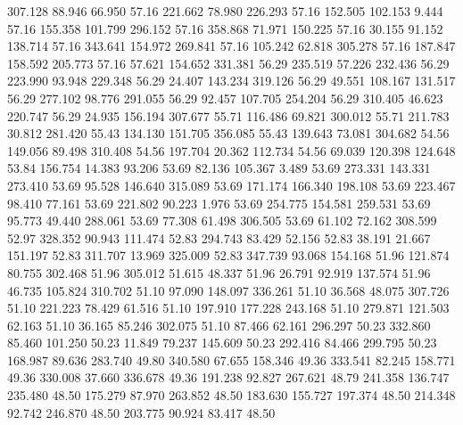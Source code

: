  307.128   88.946   66.950        57.16
 221.662   78.980  226.293        57.16
 152.505  102.153    9.444        57.16
 155.358  101.799  296.152        57.16
 358.868   71.971  150.225        57.16
  30.155   91.152  138.714        57.16
 343.641  154.972  269.841        57.16
 105.242   62.818  305.278        57.16
 187.847  158.592  205.773        57.16
  57.621  154.652  331.381        56.29
 235.519   57.226  232.436        56.29
 223.990   93.948  229.348        56.29
  24.407  143.234  319.126        56.29
  49.551  108.167  131.517        56.29
 277.102   98.776  291.055        56.29
  92.457  107.705  254.204        56.29
 310.405   46.623  220.747        56.29
  24.935  156.194  307.677        55.71
 116.486   69.821  300.012        55.71
 211.783   30.812  281.420        55.43
 134.130  151.705  356.085        55.43
 139.643   73.081  304.682        54.56
 149.056   89.498  310.408        54.56
 197.704   20.362  112.734        54.56
  69.039  120.398  124.648        53.84
 156.754   14.383   93.206        53.69
  82.136  105.367    3.489        53.69
 273.331  143.331  273.410        53.69
  95.528  146.640  315.089        53.69
 171.174  166.340  198.108        53.69
 223.467   98.410   77.161        53.69
 221.802   90.223    1.976        53.69
 254.775  154.581  259.531        53.69
  95.773   49.440  288.061        53.69
  77.308   61.498  306.505        53.69
  61.102   72.162  308.599        52.97
 328.352   90.943  111.474        52.83
 294.743   83.429   52.156        52.83
  38.191   21.667  151.197        52.83
 311.707   13.969  325.009        52.83
 347.739   93.068  154.168        51.96
 121.874   80.755  302.468        51.96
 305.012   51.615   48.337        51.96
  26.791   92.919  137.574        51.96
  46.735  105.824  310.702        51.10
  97.090  148.097  336.261        51.10
  36.568   48.075  307.726        51.10
 221.223   78.429   61.516        51.10
 197.910  177.228  243.168        51.10
 279.871  121.503   62.163        51.10
  36.165   85.246  302.075        51.10
  87.466   62.161  296.297        50.23
 332.860   85.460  101.250        50.23
  11.849   79.237  145.609        50.23
 292.416   84.466  299.795        50.23
 168.987   89.636  283.740        49.80
 340.580   67.655  158.346        49.36
 333.541   82.245  158.771        49.36
 330.008   37.660  336.678        49.36
 191.238   92.827  267.621        48.79
 241.358  136.747  235.480        48.50
 175.279   87.970  263.852        48.50
 183.630  155.727  197.374        48.50
 214.348   92.742  246.870        48.50
 203.775   90.924   83.417        48.50
